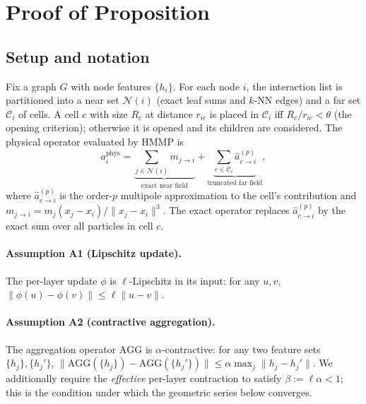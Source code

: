 \section{Proof of Proposition~\Propref}
\label{app:proof}

\subsection{Setup and notation}
Fix a graph $G$ with node features $\{h_i\}$. For each node $i$, the interaction list is
partitioned into a near set $\mathcal{N}(i)$ (exact leaf sums and $k$-NN edges) and a far set
$\mathcal{C}_i$ of cells. A cell $c$ with size $R_c$ at distance $r_{ic}$ is placed in
$\mathcal{C}_i$ iff $R_c/r_{ic}<\theta$ (the opening criterion); otherwise it is opened and
its children are considered. The physical operator evaluated by HMMP is
\begin{equation}
a_i^{\mathrm{phys}}
= \underbrace{\sum_{j \in \mathcal{N}(i)} m_{j \to i}}_{\text{exact near field}}
+ \underbrace{\sum_{c \in \mathcal{C}_i} \hat{a}_{c \to i}^{(p)}}_{\text{truncated far field}},
\end{equation}
where $\hat{a}_{c \to i}^{(p)}$ is the order-$p$ multipole approximation to the cell's
contribution and $m_{j \to i} = m_j (x_j - x_i)/\|x_j - x_i\|^3$. The exact operator replaces
$\hat{a}_{c \to i}^{(p)}$ by the exact sum over all particles in cell $c$.

\paragraph{Assumption A1 (Lipschitz update).}
The per-layer update $\phi$ is $\ell$-Lipschitz in its input: for any $u,v$,
$\|\phi(u)-\phi(v)\|\le\ell\|u-v\|$.

\paragraph{Assumption A2 (contractive aggregation).}
The aggregation operator $\mathrm{AGG}$ is $\alpha$-contractive: for any two feature sets
$\{h_j\},\{h_j'\}$,
$\|\mathrm{AGG}(\{h_j\})-\mathrm{AGG}(\{h_j'\})\|\le\alpha\max_j\|h_j-h_j'\|$.
We additionally require the \emph{effective} per-layer contraction to satisfy
$\beta:=\ell\alpha<1$; this is the condition under which the geometric series below
converges.


